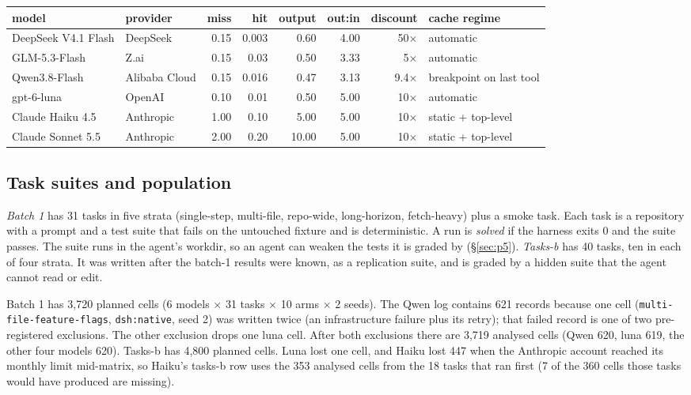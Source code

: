 \documentclass[10pt]{article}
\newenvironment{inlinetable}{\par\medskip\noindent\begin{minipage}{\linewidth}\centering\small}{\end{minipage}\par\bigskip}
\begin{document}
\begin{inlinetable}
\label{tab:models}
\setlength{\tabcolsep}{4pt}
\begin{tabular}{@{}llrrrrrl@{}}
\toprule
model & provider & miss & hit & output & out:in & discount & cache regime \\
\midrule
DeepSeek V4.1 Flash & DeepSeek & 0.15 & 0.003 & 0.60 & 4.00 & 50$\times$ & automatic \\
GLM-5.3-Flash & Z.ai & 0.15 & 0.03 & 0.50 & 3.33 & 5$\times$ & automatic \\
Qwen3.8-Flash & Alibaba Cloud & 0.15 & 0.016 & 0.47 & 3.13 & 9.4$\times$ & breakpoint on last tool \\
gpt-6-luna & OpenAI & 0.10 & 0.01 & 0.50 & 5.00 & 10$\times$ & automatic \\
Claude Haiku 4.5 & Anthropic & 1.00 & 0.10 & 5.00 & 5.00 & 10$\times$ & static + top-level \\
Claude Sonnet 5.5 & Anthropic & 2.00 & 0.20 & 10.00 & 5.00 & 10$\times$ & static + top-level \\
\bottomrule
\end{tabular}
\end{inlinetable}

\subsection{Task suites and population}

\emph{Batch 1} has 31 tasks in five strata (single-step, multi-file, repo-wide, long-horizon,
fetch-heavy) plus a smoke task. Each task is a repository with a prompt and a test suite that fails
on the untouched fixture and is deterministic. A run is \emph{solved} if the harness exits 0 and the
suite passes. The suite runs in the agent's workdir, so an agent can weaken the tests it is graded by
(\S\ref{sec:p5}). \emph{Tasks-b} has 40 tasks, ten in each of four strata. It was written after the
batch-1 results were known, as a replication suite, and is graded by a hidden suite that the agent
cannot read or edit.

Batch 1 has 3,720 planned cells (6 models $\times$ 31 tasks $\times$ 10 arms $\times$ 2 seeds).
The Qwen log contains 621 records because one cell (\texttt{multi-file-feature-flags}, \texttt{dsh:native}, seed 2)
was written twice (an infrastructure failure plus its retry); that failed record is one of two
pre-registered exclusions. The other exclusion drops one luna cell. After both exclusions there are
3,719 analysed cells (Qwen 620, luna 619, the other four models 620). Tasks-b has 4,800 planned cells.
Luna lost one cell, and Haiku lost 447 when the Anthropic account reached its monthly limit mid-matrix,
so Haiku's tasks-b row uses the 353 analysed cells from the 18 tasks that ran first (7 of the 360 cells
those tasks would have produced are missing).
\end{document}

